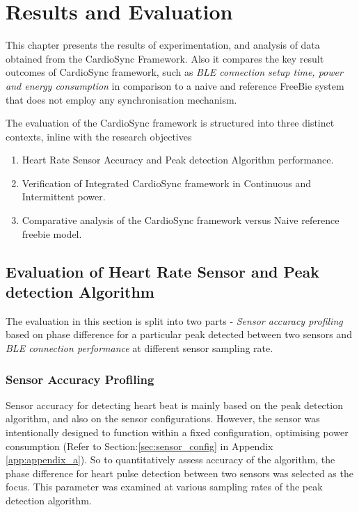 \chapter{Results and Evaluation}
\label{chap:results}

This chapter presents the results of experimentation, and analysis of data obtained from the CardioSync Framework. Also it compares the key result outcomes of CardioSync framework, such as \textit{BLE connection setup time, power and energy consumption} in comparison to a naive and reference FreeBie system that does not employ any synchronisation mechanism. 
\vspace{1\baselineskip}

\noindent The evaluation of the CardioSync framework is structured into three distinct contexts, inline with the research objectives
\begin{enumerate}
    \item Heart Rate Sensor Accuracy and Peak detection Algorithm performance.

    \item Verification of Integrated CardioSync framework in Continuous and Intermittent power.

    \item Comparative analysis of the CardioSync framework versus Naive reference freebie model.
\end{enumerate}

\section{Evaluation of Heart Rate Sensor and Peak detection Algorithm}
\label{sec:sensor_performance}
The evaluation in this section is split into two parts - \textit{Sensor accuracy profiling} based on phase difference for a particular peak detected between two sensors and \textit{BLE connection performance} at different sensor sampling rate.

\subsection{Sensor Accuracy Profiling}
Sensor accuracy for detecting heart beat is mainly based on the peak detection algorithm, and also on the sensor configurations. However, the sensor was intentionally designed to function within a fixed configuration, optimising power consumption (Refer to Section:\ref{sec:sensor_config} in Appendix \ref{app:appendix_a}). So to quantitatively assess accuracy of the algorithm, the phase difference for heart pulse detection between two sensors was selected as the focus. This parameter was examined at various sampling rates of the peak detection algorithm.

